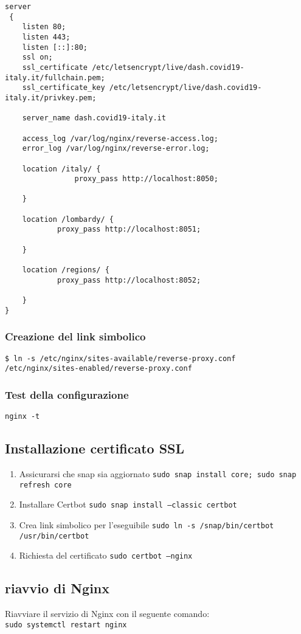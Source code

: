 \begin{lstlisting}[basicstyle=\ttfamily\small]
server
 {
    listen 80;
    listen 443;
    listen [::]:80;
    ssl on;
    ssl_certificate /etc/letsencrypt/live/dash.covid19-italy.it/fullchain.pem;
    ssl_certificate_key /etc/letsencrypt/live/dash.covid19-italy.it/privkey.pem;

    server_name dash.covid19-italy.it
    
    access_log /var/log/nginx/reverse-access.log;
    error_log /var/log/nginx/reverse-error.log;
    
    location /italy/ {
                proxy_pass http://localhost:8050;

    }

    location /lombardy/ {
            proxy_pass http://localhost:8051;

    }

    location /regions/ {
            proxy_pass http://localhost:8052;

    }
}
\end{lstlisting}

\subsubsection*{Creazione del link simbolico}
\texttt{\$ ln -s /etc/nginx/sites-available/reverse-proxy.conf\\ /etc/nginx/sites-enabled/reverse-proxy.conf}

\subsubsection*{Test della configurazione}
\texttt{nginx -t}

\subsection*{Installazione certificato SSL}
\begin{enumerate}
\item Assicurarsi che snap sia aggiornato \texttt{sudo snap install core; sudo snap refresh core}
\item Installare Certbot \texttt{sudo snap install --classic certbot}
\item Crea link simbolico per l'eseguibile \texttt{sudo ln -s /snap/bin/certbot /usr/bin/certbot}
\item Richiesta del certificato \texttt{sudo certbot --nginx}
\end{enumerate}

\subsection{riavvio di Nginx}
Riavviare il servizio di Nginx con il seguente comando: \\
\texttt{sudo systemctl restart nginx}

